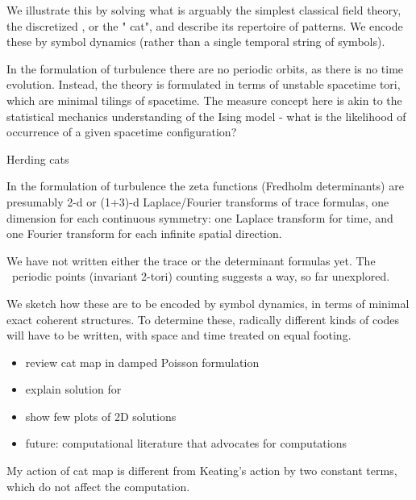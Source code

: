 \begin{description}
{We illustrate this by solving what is arguably the simplest classical
field theory, the discretized {\sPe}, or the
"{\spt} cat", and describe its repertoire of {\admissible}
{\spt} patterns. We encode these by {\spt} symbol
dynamics (rather than a single temporal string of symbols).

In the {\spt} formulation of turbulence there are no periodic
orbits, as there is no time evolution. Instead, the theory is formulated
in terms of unstable spacetime tori, which are minimal tilings of
spacetime. The measure concept here is akin to the statistical mechanics
understanding of the Ising model - what is the likelihood of occurrence
of a given spacetime configuration?

\bigskip

Herding cats

In the {\spt} formulation of turbulence the zeta functions
(Fredholm determinants) are presumably 2-d or (1+3)-d
Laplace/Fourier transforms of trace formulas, one dimension for
each continuous symmetry: one Laplace transform for time, and one
Fourier transform for each infinite spatial direction.

We have not written either the trace or the determinant formulas
yet. The \catlatt\ periodic points (invariant 2-tori)
counting suggests a way, so far unexplored.

We sketch how these are
to be encoded by {\spt} symbol dynamics, in terms of
minimal exact coherent structures. To determine these, radically
different kinds of codes will have to be written, with space and
time treated on equal footing.

\begin{itemize}
  \item review cat map in damped Poisson formulation
  \item explain solution for {\templatt}
  \item show few plots of 2D solutions
  \item future: computational literature that advocates for {\spt} computations
\end{itemize}
    }



     {
My action of cat map is different from Keating's action  by
two constant terms, which do not affect the computation.
    }


\end{description}
